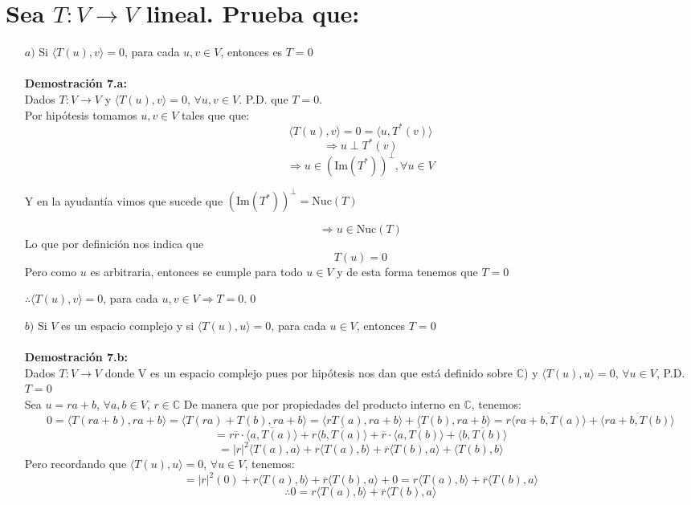 \section{Sea $T:V \longrightarrow V$ lineal. Prueba que:}


\begin{itemize}
\item[$a)$]Si $\langle T(u),v\rangle=0$, para cada $u,v \in V $, entonces es $T=0$\\\\
    \textbf{Demostración 7.a:}\\
    Dados $T:V\longrightarrow V$ y $\langle T(u),v\rangle=0$, $\forall u,v \in V $. P.D. que $T=0$.\\
    Por hip\'otesis tomamos $u,v \in V $ tales que que:
    \[\langle T(u),v\rangle= 0 = \langle u,T^* (v) \rangle\]
    \[\Longrightarrow u \perp T^*(v)\]
    \[\Longrightarrow u \in (\text{Im}(T^*))^{\perp}, \forall u \in V \]

    Y en la ayudant\'ia vimos que sucede que $(\text{Im}(T^*))^{\perp} =\text{Nuc}(T)$

    \[\Longrightarrow u \in \text{Nuc}(T)\]Lo que por definici\'on nos indica que
    \[T(u)=0\]
    Pero como $u$ es arbitraria, entonces se cumple para todo $u\in V$ y de esta forma tenemos que $T=0$

$\therefore \langle T(u),v\rangle=0$, para cada $u,v \in V \Longrightarrow T=0. $\qed


\item[$b)$] Si $V$ es un espacio complejo y si $\langle T(u), u\rangle=0$, para cada $u \in V$, entonces $T=0$ \\\\
\textbf{Demostraci\'on 7.b:}\\
Dados $T:V\longrightarrow V$ donde V es un espacio complejo pues por hip\'otesis nos dan que est\'a definido sobre $\mathbb{C}$) y $\langle T(u), u\rangle=0$, $\forall u\in V$, P.D. $T=0$ \\ 
Sea $u=ra+b$, $\forall a, b \in V$, $r \in \mathbb{C}$ De manera que por propiedades del producto interno en $\mathbb{C}$, tenemos:
\[0=\langle T(ra+b), ra+b\rangle=\langle T(ra)+T(b), ra+b\rangle=\langle rT(a), ra+b\rangle+\langle T(b), ra+b\rangle=r\overline{\langle ra+b,T(a)\rangle}+\overline{\langle ra+b,T(b)\rangle}\]\[=r\overline{r}\cdot\overline{\langle a,T(a)\rangle}+r\overline{\langle b,T(a)\rangle}+\overline{r}\cdot\overline{\langle a,T(b)\rangle}+\overline{\langle b,T(b)\rangle}\]
\[=|r|^2 \langle T(a),a \rangle + r\langle T(a),b\rangle + \overline{r}\langle  T(b), a\rangle+ \langle T(b), b\rangle\]
Pero recordando que $\langle T(u), u\rangle=0$, $\forall u\in V$, tenemos:
\[=|r|^2 (0) + r\langle T(a),b\rangle + \overline{r}\langle  T(b), a\rangle+0=r\langle T(a),b\rangle + \overline{r}\langle  T(b), a\rangle\]
\[\therefore 0=r\langle T(a),b\rangle + \overline{r}\langle  T(b),a\rangle\]


\end{itemize}
